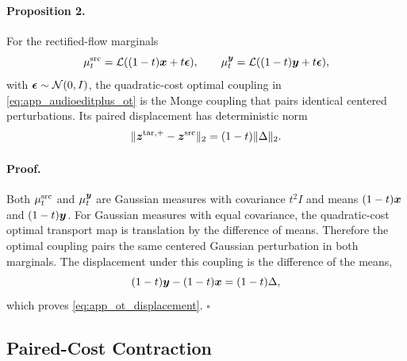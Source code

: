 \paragraph{Proposition 2.}
For the rectified-flow marginals
\[
    \mu_t^{\mathrm{src}}
    =
    \mathcal{L}((1-t)\boldsymbol{x}+t\boldsymbol{\epsilon}),
    \qquad
    \mu_t^{\boldsymbol{y}}
    =
    \mathcal{L}((1-t)\boldsymbol{y}+t\boldsymbol{\epsilon}),
\]
with $\boldsymbol{\epsilon}\sim\mathcal{N}(0,I)$, the quadratic-cost optimal coupling in \eqref{eq:app_audioeditplus_ot} is the Monge coupling that pairs identical centered perturbations.
Its paired displacement has deterministic norm
\begin{equation}
    \label{eq:app_ot_displacement}
    \|\boldsymbol{z}^{\mathrm{tar},+}-\boldsymbol{z}^{\mathrm{src}}\|_2
    =
    (1-t)\|\Delta\|_2.
\end{equation}

\paragraph{Proof.}
Both $\mu_t^{\mathrm{src}}$ and $\mu_t^{\boldsymbol{y}}$ are Gaussian measures with covariance $t^2I$ and means $(1-t)\boldsymbol{x}$ and $(1-t)\boldsymbol{y}$.
For Gaussian measures with equal covariance, the quadratic-cost optimal transport map is translation by the difference of means.
Therefore the optimal coupling pairs the same centered Gaussian perturbation in both marginals.
The displacement under this coupling is the difference of the means,
\[
    (1-t)\boldsymbol{y}-(1-t)\boldsymbol{x}
    =
    (1-t)\Delta,
\]
which proves \eqref{eq:app_ot_displacement}.
\hfill$\square$

\subsection{Paired-Cost Contraction}

